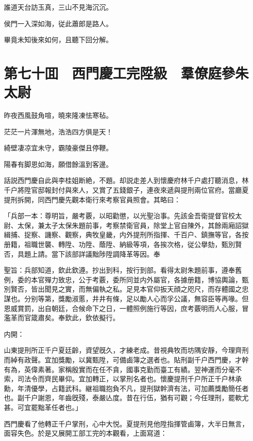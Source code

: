 誰道天台訪玉真，三山不見海沉沉。

侯門一入深如海，従此蕭郎是路人。

畢竟未知後來如何，且聽下回分解。

\chapter*{第七十囬　西門慶工完陞級　羣僚庭參朱太尉}

昨夜西風鼓角喧，曉來隆凍怯寒毡。

茫茫一片渾無地，浩浩四方俱是天！

綺壁凄凉宜未守，霸陵豪傑且停鞭。

陽春有脚恩如海，願借餘溫到客邊。

話説西門慶自此與李桂姐断絶，不題。却説走差人到懷慶府林千户處打聽消息，林千户將陞官邸報封付與來人，又賞了五錢銀子，連夜來遞與提刑兩位官府。當廳夏提刑拆開，同西門慶先觀本衛行來考察官員照會。其略曰：

「兵部一本：尊明旨，嚴考覈，以昭勸懲，以光聖治事。先該金吾衛提督官校太尉、太保，兼太子太保朱題前事，考察禁衛官員，除堂上官自陳外，其餘兩廂詔獄緝捕、捉察、譏察、觀察，典牧皇畿，内外提刑所指揮、千百户、鎮撫等官，各按册籍，祖職世襲、轉陞、功陞、蔭陞、納級等項，各挨次格，従公擧劾，甄別賢否，具題上請。當下該部詳議黜陟陞調降革等因。奉

聖旨：兵部知道，欽此欽遵。抄出到科，按行到部。看得太尉朱題前事，遵奉舊例，委的本官殫力致忠，公于考覈，委所同並内外屬官，各據册籍，博協輿論，甄別賢否，皆出聞見之實，而無偏執之私。足見本官仰扳天顔之咫尺，而存體國之忠謀也。分别等第，獎勵淑慝，井井有條，足以勵人心而孚公議，無容臣等再喙。但恩威賞罰，出自朝廷，合候命下之日，一體照例施行等因，庶考覈明而人心服，冒濫革而官箴肅矣。奉欽此，欽依擬行。

内開：

山東提刑所正千户夏廷齡，資望旣久，才練老成。昔視典牧而坊隅安靜，今理齊刑而綽有政聲。宜加獎勵，以冀甄陞，可備鹵簿之選者也。貼刑副千户西門慶，才幹有為，英偉素著。家稱殷實而在任不貪，國事克勤而臺工有績。翌神運而分毫不索，司法令而齊民畢仰。宜加轉正，以掌刑名者也。懷慶提刑千户所正千户林承勳，年清優學，占籍武科。継祖職抱負不凡，提刑獄幹濟有法，可加薦獎勵簡任者也。副千户謝恩，年齒旣殘，泰嚴亾度。昔在行伍，猶有可觀；今任理刑，罷軟尤甚。可宜罷黜革任者也。」

西門慶看了他轉正千户掌刑，心中大悦。夏提刑見他陞指揮管鹵簿，大半日無言，面容失色。於是又展開工部工完的本觀看，上面寫道：

